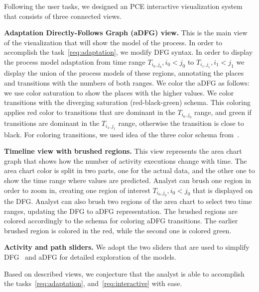 Following the user tasks, we designed an PCE interactive visualization system that consists of three connected views.

\textbf{Adaptation Directly-Follows Graph (aDFG) view.} This is the main view of the visualization that will show the model of the process. In order to accomplish the task~\ref{req:adaptation}, we modify DFG syntax. In order to display the process model adaptation from time range $T_{i_0,j_0}, i_0<j_0$ to $T_{i_1,j_1}, i_1<j_1$ we display the union of the process models of these regions, annotating the places and transitions with the numbers of both ranges. We color the aDFG as follows: we use color saturation to show the places with the higher values. We color transitions with the diverging saturation (red-black-green) schema. This coloring applies red color to transitions that are dominant in the $T_{i_0,j_0}$ range, and green if transitions are dominant in the $T_{i_1,j_1}$ range, otherwise the transition is close to black. For coloring transitions, we used idea of the three color schema from~\cite{DBLP:conf/grapp/KriglsteinR12}.

\textbf{Timeline view with brushed regions.} This view represents the area chart graph that shows how the number of activity executions change with time. The area chart color is split in two parts, one for the actual data, and the other one to show the time range where values are predicted. Analyst can brush one region in order to zoom in, creating one region of interest $T_{i_0,j_0}, i_0<j_0$ that is displayed on the DFG. Analyst can also brush two regions of the area chart to select two time ranges, updating the DFG to aDFG representation. The brushed regions are colored accordingly to the schema for coloring aDFG transitions. The earlier brushed region is colored in the red, while the second one is colored green. 

\textbf{Activity and path sliders.} We adopt the two sliders that are used to simplify DFG~\cite{leemans2019directly} and aDFG for detailed exploration of the models.

Based on described views, we conjecture that the analyst is able to accomplish the tasks~\ref{req:adaptation}, and~\ref{req:interactive} with ease.







